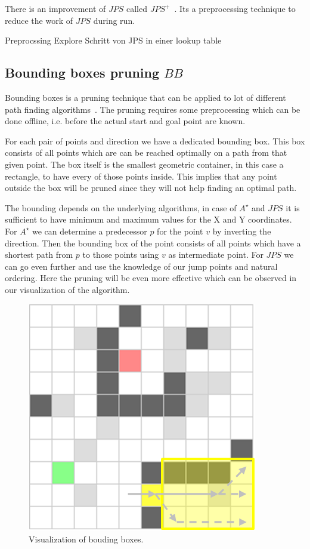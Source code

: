 \documentclass{article}
\begin{document}
    There is an improvement of $JPS$ called $JPS^+$~\cite{DBLP:conf/aips/HaraborG14}. Its a preprocessing technique to reduce the work of $JPS$ during run.

    Preprocssing
    Explore Schritt von JPS in einer lookup table



    \subsection{Bounding boxes pruning $BB$}

    Bounding boxes is a pruning technique that can be applied to lot of different path finding algorithms~\cite{DBLP:conf/aaai/RabinS16}. The pruning requires some preprocessing which can be done offline, i.e. before the actual start and goal point are known.

    For each pair of points and direction we have a dedicated bounding box. This box consists of all points which are can be reached optimally on a path from that given point. The box itself is the smallest geometric container, in this case a rectangle, to have every of those points inside. This implies that any point outside the box will be pruned since they will not help finding an optimal path.

    The bounding depends on the underlying algorithms, in case of $A^\star$ and $JPS$ it is sufficient to have minimum and maximum values for the X and Y coordinates. For $A^\star$ we can determine a predecessor $p$ for the point $v$ by inverting the direction. Then the bounding box of the point consists of all points which have a shortest path from $p$ to those points using $v$ as intermediate point. For $JPS$ we can go even further and use the knowledge of our jump points and natural ordering. Here the pruning will be even more effective which can be observed in our visualization of the algorithm.

    \begin{figure}[!htb]
        \centering
        \includegraphics{figures/bounding_boxes.png}
        \caption{Visualization of bouding boxes.}
        \label{fig:bounding_boxes}
    \end{figure}
\end{document}

